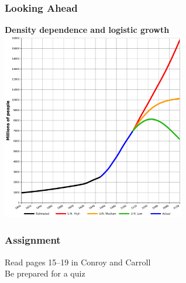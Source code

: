 \documentclass[color=usenames,dvipsnames]{beamer}\usepackage[]{graphicx}\usepackage[]{color}
\begin{document}
\begin{frame}
  \frametitle{Looking Ahead}
  \begin{center}
    {\large \bf Density dependence and logistic growth}
    \includegraphics[width=0.6\textwidth]{figs/UN-population}
  \end{center}
\end{frame}


%  




\begin{frame}
  \frametitle{Assignment}
  \Large
  Read pages 15--19 in Conroy and Carroll \\
  \vspace{1cm}
  Be prepared for a quiz \\
\end{frame}
\end{document}
